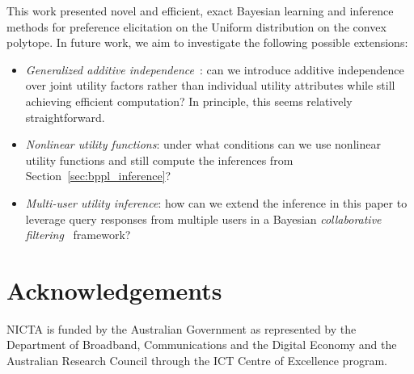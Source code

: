 \documentclass[letterpaper]{article}
\begin{document}
This work presented novel and efficient, exact Bayesian learning and
inference methods for preference elicitation on the Uniform
distribution on the convex polytope.  In future work, we aim to
investigate the following possible extensions:
\begin{itemize}
\item {\it Generalized additive
independence}~\cite{keeney_raiffa76,bacchus_grove}: can we introduce additive
independence over joint utility factors rather than individual utility 
attributes while still achieving efficient computation?  In principle,
this seems relatively straightforward.
\item {\it Nonlinear utility functions}: under what conditions can we
use nonlinear utility functions and still compute the inferences from
Section~\ref{sec:bppl_inference}?
\item {\it Multi-user utility inference}: how can we extend the
inference in this paper to leverage query responses from multiple
users in a Bayesian \emph{collaborative filtering}~\cite{collab_filtering} 
framework?
\end{itemize}

\section*{Acknowledgements}

NICTA is funded by the Australian Government as represented by
the Department of Broadband, Communications and the Digital
Economy and the Australian Research Council through the ICT
Centre of Excellence program.



\end{document}
